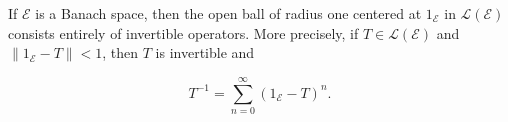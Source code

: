 If $\mathcal{E}$ is a Banach space, then the open ball of radius one centered at $1_{\mathcal{E}}$ in $\mathcal{L}(\mathcal{E})$ consists entirely of invertible operators. More precisely, if $T \in \mathcal{L}(\mathcal{E})$ and $\|1_{\mathcal{E}} - T\| < 1$, then $T$ is invertible and

$$T^{-1} = \sum_{n=0}^{\infty} (1_{\mathcal{E}} - T)^n.$$
